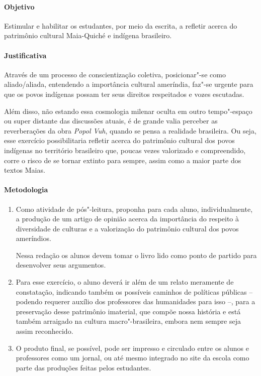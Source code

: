 \documentclass[12pt]{extarticle}
\begin{document}
\paragraph{Objetivo} Estimular e habilitar os estudantes, por meio da escrita, 
a refletir acerca do patrimônio cultural Maia-Quiché e indígena brasileiro.

\paragraph{Justificativa} Através de um processo de conscientização
coletiva, posicionar"-se como aliado/aliada, entendendo a importância cultural ameríndia, 
faz"-se urgente para que os povos indígenas possam ter seus direitos respeitados e vozes escutadas. 

Além disso, não estando essa cosmologia milenar oculta em outro tempo"-espaço ou super distante 
das discussões atuais, é de grande valia perceber as reverberações da obra \emph{Popol Vuh}, quando 
se pensa a realidade brasileira. Ou seja, esse exercício possibilitaria refletir acerca do
patrimônio cultural dos povos indígenas no território brasileiro que, poucas vezes valorizado e compreendido, 
corre o risco de se tornar extinto para sempre, assim como a maior
parte dos textos Maias.

\paragraph{Metodologia} 

\begin{enumerate}
\item
Como atividade de pós"-leitura, proponha para cada aluno, individualmente, a produção de um artigo 
de opinião acerca da importância do respeito à diversidade de culturas e a valorização do
patrimônio cultural dos povos ameríndios. 

Nessa redação os alunos devem tomar o
livro lido como ponto de partido para desenvolver seus argumentos. 

\item
Para esse exercício, o aluno deverá ir além de um relato meramente de
constatação, indicando também os possíveis caminhos de políticas públicas --
podendo requerer auxílio dos professores das humanidades para isso --,
para a preservação desse patrimônio imaterial, que compõe nossa história
e está também arraigado na cultura macro"-brasileira, embora nem sempre
seja assim reconhecido.

\item
O produto final, se possível, pode ser impresso e circulado entre os alunos e 
professores como um jornal, ou até mesmo integrado no site da escola como parte das 
produções feitas pelos estudantes. 

\end{enumerate}
\end{document}
